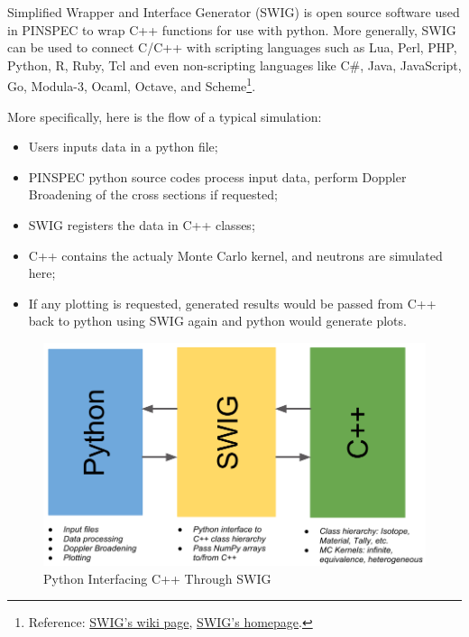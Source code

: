 \documentclass[titlepage]{article}
\begin{document}
Simplified Wrapper and Interface Generator (SWIG) is open source software used in PINSPEC to wrap C++ functions for use with python. More generally, SWIG can be used to connect C/C++ with scripting languages such as Lua, Perl, PHP, Python, R, Ruby, Tcl and even non-scripting languages like C\#, Java, JavaScript, Go, Modula-3, Ocaml, Octave, and Scheme\footnote{Reference: \href{http://en.wikipedia.org/wiki/SWIG}{SWIG's wiki page}, \href{http://www.swig.org/exec.html}{SWIG's homepage}.}. 

More specifically, here is the flow of a typical simulation:
\begin{itemize}
\item Users inputs data in a python file;
\item PINSPEC python source codes process input data, perform Doppler Broadening of the cross sections if requested;
\item SWIG registers the data in C++ classes;
\item C++ contains the actualy Monte Carlo kernel, and neutrons are simulated here;
\item If any plotting is requested, generated results would be passed from C++ back to python using SWIG again and python would generate plots. 
\end{itemize}

\begin{figure}[h]
  \centering
  \includegraphics[width=5in]{images/high-level.png}
  \caption{Python Interfacing C++ Through SWIG} \label{high-level}
\end{figure}


\clearpage
\end{document}
